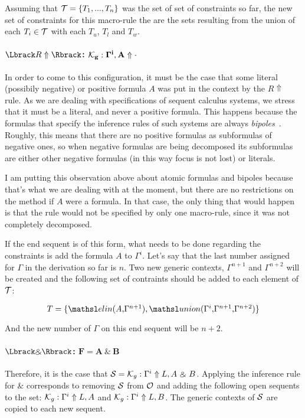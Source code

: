 Assuming that $\mathcal{T} = \{ T_1, ..., T_n \}$ was the set of set of constraints so
far, the new set of constraints for this macro-rule the are the sets resulting
from the union of each $T_i \in \mathcal{T}$ with each $T_u$, $T_l$ and $T_w$.

\paragraph{$\alg{R\Uparrow}$: $\mathbf{\mathcal{K}_{g} : \Gamma^i, A \Uparrow \cdot}$\\} 
In order to come to this configuration, it must be the case that some literal
(possibily negative) or
positive formula $A$ was put in the context by the $R\Uparrow$ rule. As we are
dealing with specifications of sequent calculus systems, we stress that it must
be a literal, and never a positive formula. This happens because the formulas
that specify the inference rules of such systems are always
\textit{bipoles}~\cite{paper da Elaine e Dale? da Agata?}. Roughly, this means
that there are no positive formulas as subformulas of negative ones, so when
negative formulas are being decomposed its subformulas are either other negative
formulas (in this way focus is not lost) or literals.

\begin{giselle}
I am putting this observation above about atomic formulas and bipoles because
that's what we are dealing with at the moment, but there are no restrictions on
the method if $A$ were a formula. In that case, the only thing that would happen
is that the rule would not be specified by only one macro-rule, since it was not
completely decomposed.
\end{giselle}

If the end sequent is of this form, what needs to be done regarding the
constraints is add the formula $A$ to $\Gamma^i$. Let's say that the last number
assigned for $\Gamma$ in the derivation so far is $n$. Two new generic
contexts, $\Gamma^{n+1}$ and $\Gamma^{n+2}$ will be created and 
the following set of contraints should be added to each element of $\mathcal{T}$:

$$T = \{ \elin{A}{\Gamma^{n+1}}, \union{\Gamma^i}{\Gamma^{n+1}}{\Gamma^{n+2}} \}$$

And the new number of $\Gamma$ on this end sequent will be $n+2$.

\paragraph{$\alg{\binampersand}$: $\mathbf{F = A\ \binampersand\ B}$\\}
Therefore, it is the case that $\mathcal{S} = \mathcal{K}_{g} : \Gamma^i \Uparrow L, A\
\binampersand\ B$. Applying the inference rule for $\binampersand$ corresponds to
removing $\mathcal{S}$ from $\mathcal{O}$ and adding the following open sequents to the set:
$\mathcal{K}_{g} : \Gamma^i \Uparrow L, A$ and $\mathcal{K}_{g} : \Gamma^i \Uparrow L, B$. The
generic contexts of $\mathcal{S}$ are copied to each new sequent.

